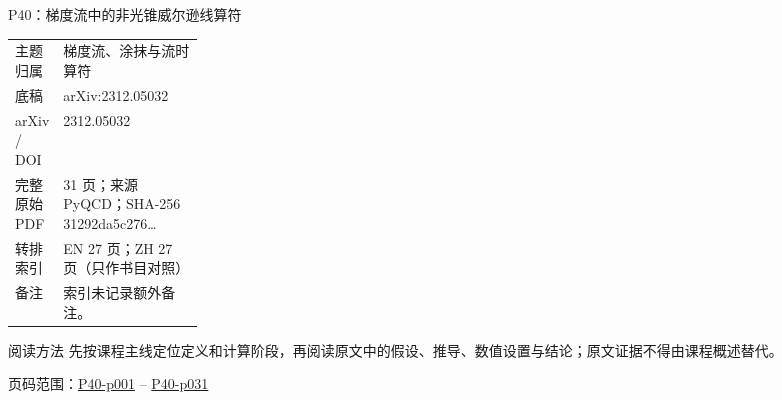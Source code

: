 \documentclass[aspectratio=169,10pt]{ctexbeamer}
\begin{document}
\begin{frame}[t]{P40：梯度流中的非光锥威尔逊线算符}
\small\begin{tabularx}{\linewidth}{p{0.22\linewidth}Y}
\toprule 主题归属 & 梯度流、涂抹与流时算符\\
底稿 & arXiv:2312.05032\\
arXiv / DOI & 2312.05032\\
完整原始 PDF & 31 页；来源 PyQCD；SHA-256 31292da5c276\ldots\\
转排索引 & EN 27 页；ZH 27 页（只作书目对照）\\
备注 & 索引未记录额外备注。\\
\bottomrule\end{tabularx}\vspace{0.25cm}
\begin{block}{阅读方法}
先按课程主线定位定义和计算阶段，再阅读原文中的假设、推导、数值设置与结论；原文证据不得由课程概述替代。
\end{block}
\vfill 页码范围：\hyperlink{P40-p001}{P40-p001} -- \hyperlink{P40-p031}{P40-p031}
\end{frame}
\end{document}
